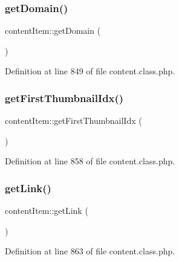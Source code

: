 \mbox{\label{classcontentItem_a7a513d119938877566418029c6124a45}} 
\subsubsection{\texorpdfstring{get\+Domain()}{getDomain()}}
{\footnotesize\ttfamily content\+Item\+::get\+Domain (\begin{DoxyParamCaption}{ }\end{DoxyParamCaption})}



Definition at line 849 of file content.\+class.\+php.

\mbox{\label{classcontentItem_a0de8d1dad2347b9f91bc4f16df2c4a12}} 
\subsubsection{\texorpdfstring{get\+First\+Thumbnail\+Idx()}{getFirstThumbnailIdx()}}
{\footnotesize\ttfamily content\+Item\+::get\+First\+Thumbnail\+Idx (\begin{DoxyParamCaption}{ }\end{DoxyParamCaption})}



Definition at line 858 of file content.\+class.\+php.

\mbox{\label{classcontentItem_a8e5d8c09bab20f5a0cd0874504cf5a5e}} 
\subsubsection{\texorpdfstring{get\+Link()}{getLink()}}
{\footnotesize\ttfamily content\+Item\+::get\+Link (\begin{DoxyParamCaption}{ }\end{DoxyParamCaption})}



Definition at line 863 of file content.\+class.\+php.

